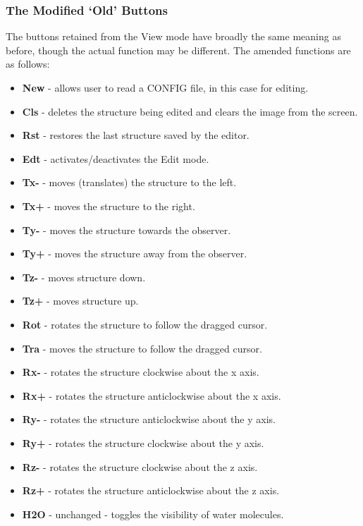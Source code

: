 \subsubsection{The Modified `Old' Buttons}

The buttons retained from the View mode have broadly the same meaning as
before, though the actual function may be different. The amended functions are
as follows:
\begin{itemize}
\item {\bf New} - allows user to read a CONFIG file, in this case for editing.
\item {\bf Cls} - deletes the structure being edited and clears the image from
  the screen.
\item {\bf Rst} - restores the last structure saved by the editor.
\item {\bf Edt} - activates/deactivates the Edit mode.
\item {\bf Tx-} - moves (translates) the structure to the left.
\item {\bf Tx+} - moves the structure to the right.
\item {\bf Ty-} - moves the structure towards the observer.
\item {\bf Ty+} - moves the structure away from the observer.
\item {\bf Tz-} - moves structure down.
\item {\bf Tz+} - moves structure up.
\item {\bf Rot} - rotates the structure to follow the dragged cursor.
\item {\bf Tra} - moves the structure to follow the dragged cursor.
\item {\bf Rx-} - rotates the structure clockwise about the x axis.
\item {\bf Rx+} - rotates the structure anticlockwise about the x axis.
\item {\bf Ry-} - rotates the structure anticlockwise about the y axis.
\item {\bf Ry+} - rotates the structure clockwise about the y axis.
\item {\bf Rz-} - rotates the structure clockwise about the z axis.
\item {\bf Rz+} - rotates the structure anticlockwise about the z axis.
\item {\bf H2O} - unchanged - toggles the visibility of water molecules.
\end{itemize}

